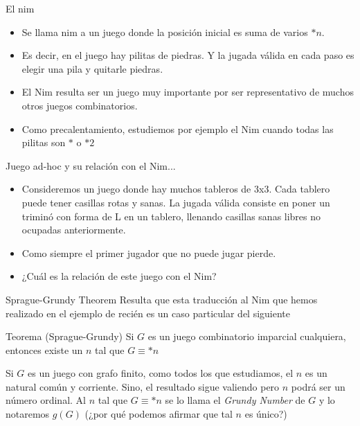 \documentclass{beamer}
\begin{document}
\begin{frame}{El nim}
    \begin{itemize}
        \item Se llama nim a un juego donde la posición inicial es suma de varios $*n$.
        \item Es decir, en el juego hay pilitas de piedras. Y la jugada válida en cada paso es elegir una pila y quitarle piedras.
        \item El Nim resulta ser un juego muy importante por ser representativo de muchos otros juegos combinatorios.
        \item Como precalentamiento, estudiemos por ejemplo el Nim cuando todas las pilitas son $*$ o $*2$
    \end{itemize}
\end{frame}

\begin{frame}{Juego ad-hoc y su relación con el Nim...}
    \begin{itemize}
        \item Consideremos un juego donde hay muchos tableros de 3x3. Cada tablero puede tener casillas rotas y sanas. La jugada
        válida consiste en poner un triminó con forma de L en un tablero, llenando casillas sanas libres no ocupadas anteriormente.
        \item Como siempre el primer jugador que no puede jugar pierde.
        \item ¿Cuál es la relación de este juego con el Nim?
    \end{itemize}
\end{frame}

\begin{frame}{Sprague-Grundy Theorem}
    Resulta que esta traducción al Nim que hemos realizado en el ejemplo de recién es un caso particular del siguiente
    \begin{block}{Teorema (Sprague-Grundy)}
        Si $G$ es un juego combinatorio imparcial cualquiera, entonces existe un $n$ tal que $G \equiv *n$
    \end{block}
    Si $G$ es un juego con grafo finito, como todos los que estudiamos, el $n$ es un natural común y corriente. Sino, el resultado
    sigue valiendo pero $n$ podrá ser un número ordinal. Al $n$ tal que $G \equiv *n$ se lo llama el \textit{Grundy Number} de $G$ y
    lo notaremos $g(G)$ (¿por qué podemos afirmar que tal $n$ es único?)
\end{frame}
\end{document}
